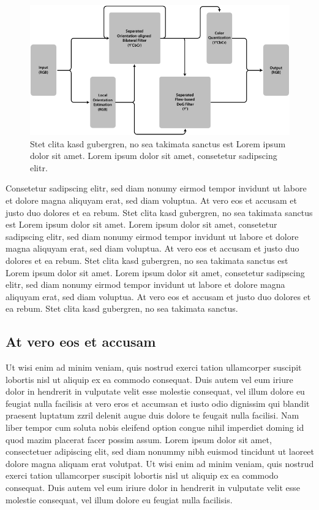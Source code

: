 \begin{figure}
    \includegraphics[width=\textwidth]{graphics/test3}
    \caption{Stet clita kasd gubergren, no sea takimata sanctus est Lorem ipsum dolor sit amet. Lorem ipsum dolor sit amet, consetetur sadipscing elitr.}
\end{figure}

Consetetur sadipscing elitr, \citep{Yang.etal-1996} sed diam nonumy eirmod tempor invidunt ut labore et dolore magna aliquyam erat, sed diam voluptua. At vero eos et accusam et justo duo dolores et ea rebum. Stet clita kasd gubergren, no sea takimata sanctus est Lorem ipsum dolor sit amet. Lorem ipsum dolor sit amet, consetetur sadipscing elitr, sed diam nonumy eirmod tempor invidunt ut labore et dolore magna aliquyam erat, sed diam voluptua. At vero eos et accusam et justo duo dolores et ea rebum. Stet clita kasd gubergren, no sea takimata sanctus est Lorem ipsum dolor sit amet. Lorem ipsum dolor sit amet, consetetur sadipscing elitr, sed diam nonumy eirmod tempor invidunt ut labore et dolore magna aliquyam erat, sed diam voluptua. At vero eos et accusam et justo duo dolores et ea rebum. Stet clita kasd gubergren, no sea takimata sanctus.


\subsection{At vero eos et accusam}
Ut wisi enim ad minim veniam, quis nostrud exerci tation ullamcorper suscipit lobortis nisl ut aliquip ex ea commodo consequat. Duis autem vel eum iriure dolor in hendrerit in vulputate velit esse molestie consequat, vel illum dolore eu feugiat \citep{Guichard.Morel-2003} nulla facilisis at vero eros et accumsan et iusto odio dignissim qui blandit praesent luptatum zzril delenit augue duis dolore te feugait nulla facilisi.
Nam liber tempor cum soluta nobis eleifend option congue nihil imperdiet doming id quod mazim placerat facer possim assum. Lorem ipsum dolor sit amet, consectetuer adipiscing elit, sed diam nonummy nibh euismod tincidunt ut laoreet dolore magna aliquam erat volutpat. Ut wisi enim ad minim veniam, quis nostrud exerci tation ullamcorper suscipit lobortis nisl ut aliquip ex ea commodo consequat.
Duis autem vel eum iriure dolor in hendrerit in vulputate velit esse molestie consequat, vel illum dolore eu feugiat nulla facilisis.


